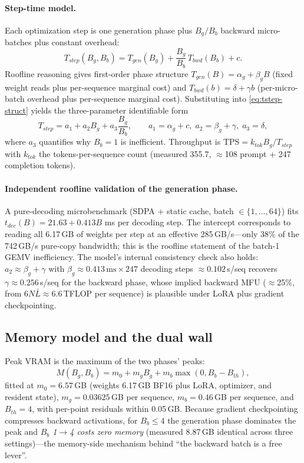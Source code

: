 \documentclass[11pt]{article}
\theoremstyle{definition}
\begin{document}
\paragraph{Step-time model.} Each optimization step is one generation phase plus
$B_g/B_b$ backward micro-batches plus constant overhead:
\begin{equation}\label{eq:tstep-struct}
T_{step}(B_g,B_b) = T_{gen}(B_g) + \frac{B_g}{B_b}\,T_{bwd}(B_b) + c .
\end{equation}
Roofline reasoning gives first-order phase structure $T_{gen}(B)=\alpha_g+\beta_g B$
(fixed weight reads plus per-sequence marginal cost) and
$T_{bwd}(b)=\delta+\gamma b$ (per-micro-batch overhead plus per-sequence marginal
cost). Substituting into \eqref{eq:tstep-struct} yields the three-parameter
identifiable form
\begin{equation}\label{eq:tstep}
T_{step} = a_1 + a_2 B_g + a_3\frac{B_g}{B_b}, \qquad
a_1=\alpha_g+c,\; a_2=\beta_g+\gamma,\; a_3=\delta,
\end{equation}
where $a_3$ quantifies why $B_b{=}1$ is inefficient. Throughput is
$\mathrm{TPS}=k_{tok}B_g/T_{step}$ with $k_{tok}$ the tokens-per-sequence count
(measured 355.7, $\approx$108 prompt + 247 completion tokens).

\paragraph{Independent roofline validation of the generation phase.}
\label{sec:l1-roofline}
A pure-decoding microbenchmark (SDPA + static cache, batch $\in\{1,\dots,64\}$)
fits $t_{dec}(B)=21.63+0.413B$ ms per decoding step. The intercept corresponds to
reading all 6.17\,GB of weights per step at an effective 285\,GB/s---only 38\% of
the 742\,GB/s pure-copy bandwidth; this is the roofline statement of the batch-1
GEMV inefficiency. The model's internal consistency check also holds:
$a_2\approx\beta_g+\gamma$ with $\beta_g\approx0.413\,\text{ms}\times 247$
decoding steps $\approx0.102$\,s/seq recovers $\gamma\approx0.256$\,s/seq for the
backward phase, whose implied backward MFU ($\approx$25\%, from
$6N\bar L\approx6.6$\,TFLOP per sequence) is plausible under LoRA plus gradient
checkpointing.

\subsection{Memory model and the dual wall}\label{sec:l1-mem}
Peak VRAM is the maximum of the two phases' peaks:
\begin{equation}\label{eq:mem}
M(B_g,B_b) = m_0 + m_g B_g + m_b\max(0, B_b - B_{th}),
\end{equation}
fitted at $m_0{=}6.57$\,GB (weights 6.17\,GB BF16 plus LoRA, optimizer, and
resident state), $m_g{=}0.03625$\,GB per sequence, $m_b{=}0.46$\,GB per sequence,
and $B_{th}{=}4$, with per-point residuals within 0.05\,GB. Because gradient checkpointing compresses backward
activations, for $B_b\le4$ the generation phase dominates the peak and
\emph{$B_b$ 1$\to$4 costs zero memory} (measured 8.87\,GB identical across three
settings)---the memory-side mechanism behind ``the backward batch is a free
lever''.
\end{document}
